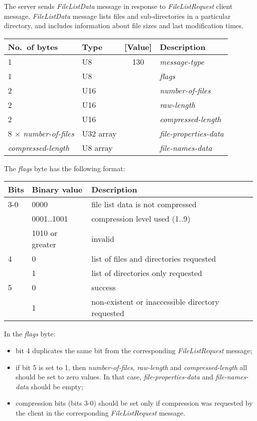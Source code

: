 \documentclass[a4paper]{article}
\newcommand{\typestr}[1]{\textit{#1}}
\begin{document}
The server sends \typestr{FileListData} message in response to
\typestr{FileListRequest} client message. \typestr{FileListData}
message lists files and sub-directories in a particular directory, and
includes information about file sizes and last modification times.

\begin{tabular}{l|lc|l} \hline
No.\ of bytes & Type & [Value] & Description \\ \hline
1 & U8  & 130 & \typestr{message-type} \\
1 & U8  &     & \typestr{flags} \\
2 & U16 &     & \typestr{number-of-files} \\
2 & U16 &     & \typestr{raw-length} \\
2 & U16 &     & \typestr{compressed-length} \\
8 $\times$ \typestr{number-of-files} & U32 array & & \typestr{file-properties-data} \\
\typestr{compressed-length} & U8 array & & \typestr{file-names-data} \\
\hline\end{tabular}

The \typestr{flags} byte has the following format:

\begin{tabular}{l|l|l}
\hline
Bits & Binary value   & Description \\ \hline
3-0 & 0000            & file list data is not compressed \\
    & 0001..1001      & compression level used (1..9) \\
    & 1010 or greater & invalid \\
\hline
4   & 0   & list of files and directories requested \\
    & 1   & list of directories only requested \\
\hline
5   & 0   & success \\
    & 1   & non-existent or inaccessible directory requested \\
\hline
\end{tabular}

In the \typestr{flags} byte:

\begin{itemize}
\item bit 4 duplicates the same bit from the corresponding
  \typestr{FileListRequest} message;
\item if bit 5 is set to 1, then \typestr{number-of-files},
  \typestr{raw-length} and \typestr{compressed-length} all should be
  set to zero values. In that case, \typestr{file-properties-data} and
  \typestr{file-names-data} should be empty;
\item compression bits (bits 3-0) should be set only if compression
  was requested by the client in the corresponding
  \typestr{FileListRequest} message.
\end{itemize}
\end{document}
